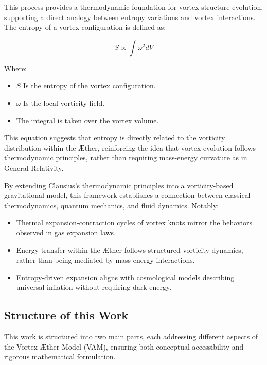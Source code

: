 This process provides a thermodynamic foundation for vortex structure evolution, supporting a direct analogy between entropy variations and vortex interactions.
The entropy of a vortex configuration is defined as:

\begin{equation*} \label{eq:Entropy}
S \propto \int \omega^2 dV
\end{equation*}

Where:

\begin{itemize}
    \item \( S \) Is the entropy of the vortex configuration.
    \item \( \omega \)  Is the local vorticity field.
    \item The integral is taken over the vortex volume.
\end{itemize}

This equation suggests that entropy is directly related to the vorticity distribution within the Æther, reinforcing the idea that vortex evolution follows thermodynamic principles, rather than requiring mass-energy curvature as in General Relativity.

By extending Clausius's thermodynamic principles into a vorticity-based gravitational model, this framework establishes a connection between classical thermodynamics, quantum mechanics, and fluid dynamics. Notably:

\begin{itemize}
    \item Thermal expansion-contraction cycles of vortex knots mirror the behaviors observed in gas expansion laws.
    \item Energy transfer within the Æther follows structured vorticity dynamics, rather than being mediated by mass-energy interactions.
    \item Entropy-driven expansion aligns with cosmological models describing universal inflation without requiring dark energy.
\end{itemize}

\subsection*{Structure of this Work}

This work is structured into two main parts, each addressing different aspects of the Vortex Æther Model (VAM), ensuring both conceptual accessibility and rigorous mathematical formulation.

